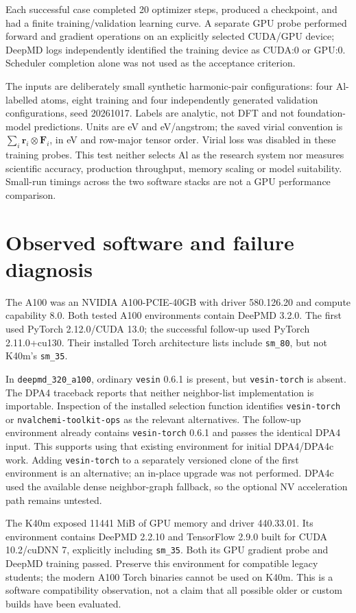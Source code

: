 \documentclass[10pt,a4paper]{article}
\begin{document}
Each successful case completed 20 optimizer steps, produced a checkpoint,
and had a finite training/validation learning curve. A separate GPU probe
performed forward and gradient operations on an explicitly selected CUDA/GPU
device; DeepMD logs independently identified the training device as CUDA:0 or GPU:0.
Scheduler completion alone was not used as the acceptance criterion.

The inputs are deliberately small synthetic harmonic-pair configurations:
four Al-labelled atoms, eight training and four independently generated
validation configurations, seed 20261017. Labels are analytic, not DFT and
not foundation-model predictions. Units are eV and eV/angstrom; the saved
virial convention is $\sum_i\mathbf r_i\otimes\mathbf F_i$, in eV and
row-major tensor order. Virial loss was disabled in these training probes.
This test neither selects Al as the research system nor measures scientific
accuracy, production throughput, memory scaling or model suitability.
Small-run timings across the two software stacks are not a GPU performance comparison.

\section{Observed software and failure diagnosis}
The A100 was an NVIDIA A100-PCIE-40GB with driver 580.126.20 and compute
capability 8.0. Both tested A100 environments contain DeePMD 3.2.0.
The first used PyTorch 2.12.0/CUDA 13.0; the successful follow-up used
PyTorch 2.11.0+cu130. Their installed Torch architecture lists include
\texttt{sm\_80}, but not K40m's \texttt{sm\_35}.

In \texttt{deepmd\_320\_a100}, ordinary \texttt{vesin} 0.6.1 is present,
but \texttt{vesin-torch} is absent. The DPA4 traceback reports that neither
neighbor-list implementation is importable. Inspection of the installed
selection function identifies \texttt{vesin-torch} or
\texttt{nvalchemi-toolkit-ops} as the relevant alternatives.
The follow-up environment already contains \texttt{vesin-torch} 0.6.1 and
passes the identical DPA4 input. This supports using that existing environment
for initial DPA4/DPA4c work. Adding \texttt{vesin-torch} to a separately
versioned clone of the first environment is an alternative; an in-place
upgrade was not performed. DPA4c used the available dense neighbor-graph
fallback, so the optional NV acceleration path remains untested.

The K40m exposed 11441 MiB of GPU memory and driver 440.33.01.
Its environment contains DeePMD 2.2.10 and TensorFlow 2.9.0 built for
CUDA 10.2/cuDNN 7, explicitly including \texttt{sm\_35}. Both its GPU
gradient probe and DeepMD training passed. Preserve this environment for
compatible legacy students; the modern A100 Torch binaries cannot be used
on K40m. This is a software compatibility observation, not a claim that all
possible older or custom builds have been evaluated.
\end{document}
